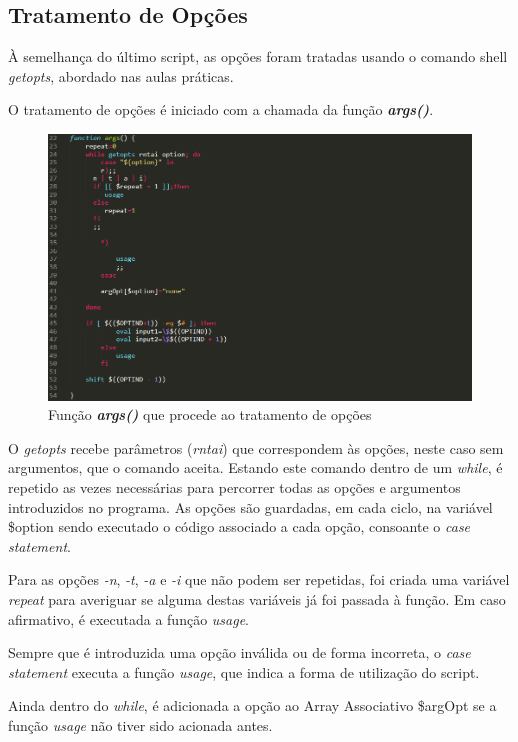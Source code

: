 \documentclass[10pt,portuguese]{article}
\begin{document}
\subsection{Tratamento de Opções}
À semelhança do último script, as opções foram tratadas usando o comando shell \textit{getopts}, abordado nas aulas práticas.
\newline
\par O tratamento de opções é iniciado com a chamada da função \textbf{\textit{args()}}.
\begin{figure}[!h]
    \centering
    \includegraphics[width=\textwidth]{comparestats/getopts_c.png}
    \caption{Função \textbf{\textit{args()}} que procede ao tratamento de opções}
\end{figure}
\par O \textit{getopts} recebe parâmetros (\textit{rntai}) que correspondem às opções, neste caso sem argumentos, que o comando aceita. Estando este comando dentro de um \textit{while}, é repetido as vezes necessárias para percorrer todas as opções e argumentos introduzidos no programa. As opções são guardadas, em cada ciclo, na variável \$option sendo executado o código associado a cada opção, consoante o \textit{case statement}.
\par Para as opções \textit{-n}, \textit{-t}, \textit{-a} e \textit{-i} que não podem ser repetidas, foi criada uma variável \textit{repeat} para averiguar se alguma destas variáveis já foi passada à função. Em caso afirmativo, é executada a função \textit{usage}. 
\par Sempre que é introduzida uma opção inválida ou de forma incorreta, o \textit{case statement} executa a função \textit{usage}, que indica a forma de utilização do script.
\par Ainda dentro do \textit{while}, é adicionada a opção ao Array Associativo \$argOpt se a função \textit{usage} não tiver sido acionada antes.
\end{document}
